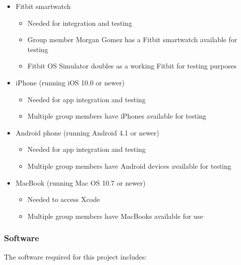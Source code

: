 \documentclass[12pt,letterpaper]{article}
\begin{document}
\begin{itemize}
  \item Fitbit smartwatch
  \begin{itemize}
    \item Needed for integration and testing
    \item Group member Morgan Gomez has a Fitbit smartwatch available for testing
    \item Fitbit OS Simulator doubles as a working Fitbit for testing purposes
  \end{itemize}
  
  \item iPhone (running iOS 10.0 or newer)
  \begin{itemize}
    \item Needed for app integration and testing
    \item Multiple group members have iPhones available for testing
  \end{itemize}
  
  \item Android phone (running Android 4.1 or newer)
  \begin{itemize}
    \item Needed for app integration and testing
    \item Multiple group members have Android devices available for testing
  \end{itemize}
  
  \item MacBook (running Mac OS 10.7 or newer)
  \begin{itemize}
    \item Needed to access Xcode
    \item Multiple group members have MacBooks available for use
  \end{itemize}
\end{itemize}

\subsubsection*{Software}

\noindent
The software required for this project includes:
\end{document}
